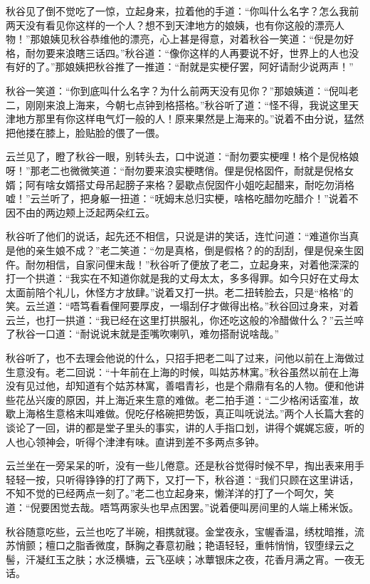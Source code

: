 \documentclass[12pt,UTF8]{ctexbook}
\begin{document}
{{{秋谷见了倒不觉吃了一惊，立起身来，拉着他的手道：“你叫什么名字？怎么我前两天没有看见你这样的一个人？想不到天津地方的娘姨，也有你这般的漂亮人物！”那娘姨见秋谷恭维他的漂亮，心上甚是得意，对着秋谷一笑道：“倪是勿好格，耐勿要来浪瞎三话四。”秋谷道：“像你这样的人再要说不好，世界上的人也没有好的了。”那娘姨把秋谷推了一推道：“耐就是实梗仔罢，阿好请耐少说两声！”

秋谷一笑道：“你到底叫什么名字？为什么前两天没有见你？”那娘姨道：“倪叫老二，刚刚来浪上海来，今朝七点钟到格搭格。”秋谷听了道：“怪不得，我说这里天津地方那里有你这样电气灯一般的人！原来果然是上海来的。”说着不由分说，猛然把他搂在膝上，脸贴脸的偎了一偎。

云兰见了，瞪了秋谷一眼，别转头去，口中说道：“耐勿要实梗哩！格个是倪格娘呀！”那老二也微微笑道：“耐勿要来浪实梗瞎俏。俚是倪格囡仵，耐就是倪格女婿；阿有啥女婿搭丈母吊起膀子来格？晏歇点倪囡仵小姐吃起醋来，耐吃勿消格嘘！”云兰听了，把身躯一扭道：“呒姆末总归实梗，啥格吃醋勿吃醋介！”说着不因不由的两边颊上泛起两朵红云。

秋谷听了他们的说话，起先还不相信，只说是讲的笑话，连忙问道：“难道你当真是他的亲生娘不成？”老二笑道：“勿是真格，倒是假格？的的刮刮，俚是倪亲生囡仵。耐勿相信，自家问俚末哉！”秋谷听了便放了老二，立起身来，对着他深深的打一个拱道：“我实在不知道你就是我的丈母太太，多多得罪。如今只好在丈母太太面前陪个礼儿，休怪方才放肆。”说着又打一拱。老二扭转脸去，只是“格格”的笑。云兰道：“唔笃看看俚阿要厚皮，一塌刮仔才做得出格。”秋谷回过身来，对着云兰，也打一拱道：“我已经在这里打拱服礼，你还吃这般的冷醋做什么？”云兰啐了秋谷一口道：“耐说说末就是歪嘴吹喇叭，难勿搭耐说啥哉。”

秋谷听了，也不去理会他说的什么，只招手把老二叫了过来，问他以前在上海做过生意没有。老二回说：“十年前在上海的时候，叫姑苏林寓。”秋谷虽然以前在上海没有见过他，却知道有个姑苏林寓，善唱青衫，也是个鼎鼎有名的人物。便和他讲些花丛兴废的原因，并上海近来生意的难做。老二拍手道：“二少格闲话蛮准，故歇上海格生意格末叫难做。倪吃仔格碗把势饭，真正叫呒说法。”两个人长篇大套的谈论了一回，讲的都是堂子里头的事实，讲的人手指口划，讲得个娓娓忘疲，听的人也心领神会，听得个津津有味。直讲到差不多两点多钟。

云兰坐在一旁呆呆的听，没有一些儿倦意。还是秋谷觉得时候不早，掏出表来用手轻轻一按，只听得铮铮的打了两下，又打一下，秋谷道：“我们只顾在这里讲话，不知不觉的已经两点一刻了。”老二也立起身来，懒洋洋的打了一个呵欠，笑道：“倪要困觉去哉。唔笃两家头也早点困罢。”说着便叫房间里的人端上稀米饭。

秋谷随意吃些，云兰也吃了半碗，相携就寝。金堂夜永，宝幄香温，绣枕暗推，流苏悄颤；檀口之脂香微度，酥胸之春意初融；艳语轻轻，重帏悄悄，钗堕绿云之髻，汗凝红玉之肤；水泛横塘，云飞巫峡；冰蕈银床之夜，花香月满之宵。一夜无话。

}}}
\end{document}
